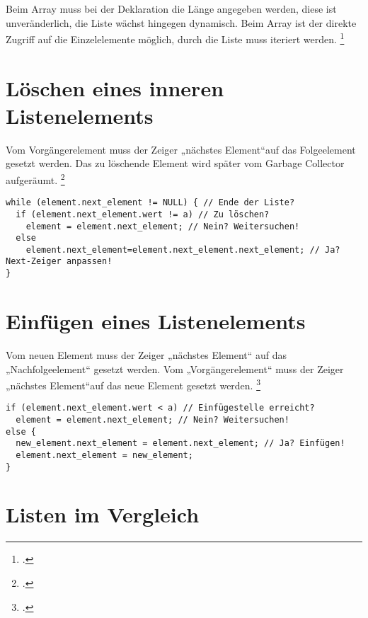 \documentclass{bschlangaul-theorie}
\begin{document}
Beim Array muss bei der Deklaration die Länge angegeben werden, diese
ist unveränderlich, die Liste wächst hingegen dynamisch. Beim Array
ist der direkte Zugriff auf die Einzelelemente möglich, durch die Liste
muss iteriert werden.
\footcite[Seite 4]{aud:fs:4}

%

\section{Löschen eines inneren Listenelements}

Vom Vorgängerelement muss der Zeiger „nächstes Element“auf das
Folgeelement gesetzt werden. Das zu löschende Element wird später vom
Garbage Collector aufgeräumt.
\footcite[Seite 9-10]{aud:fs:4}

\begin{verbatim}
while (element.next_element != NULL) { // Ende der Liste?
  if (element.next_element.wert != a) // Zu löschen?
    element = element.next_element; // Nein? Weitersuchen!
  else
    element.next_element=element.next_element.next_element; // Ja? Next-Zeiger anpassen!
}
\end{verbatim}

\section{Einfügen eines Listenelements}

Vom neuen Element muss der Zeiger „nächstes Element“ auf das
„Nachfolgeelement“ gesetzt werden. Vom „Vorgängerelement“ muss der
Zeiger „nächstes Element“auf das neue Element gesetzt werden.
\footcite[Seite 11-12]{aud:fs:4}

\begin{verbatim}
if (element.next_element.wert < a) // Einfügestelle erreicht?
  element = element.next_element; // Nein? Weitersuchen!
else {
  new_element.next_element = element.next_element; // Ja? Einfügen!
  element.next_element = new_element;
}
\end{verbatim}

%

\section{Listen im Vergleich}
\end{document}
